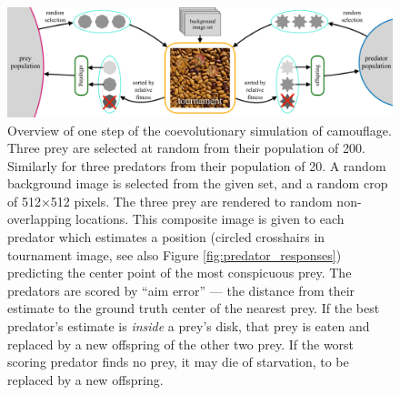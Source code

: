 \documentclass[acmtog]{acmart}
\begin{document}
\begin{figure}
    \includegraphics[width=\textwidth]{images/coc_overview.pdf}
    \caption{Overview of one step of the coevolutionary simulation of camouflage. Three prey are selected at random from their population of 200. Similarly for three predators from their population of 20. A random background image is selected from the given set, and a random crop of 512×512 pixels. The three prey are rendered to random non-overlapping locations. This composite image is given to each predator which estimates a position (circled crosshairs in tournament image, see also Figure \ref{fig:predator_responses}) predicting the center point of the most conspicuous prey. The predators are scored by “aim error” — the distance from their estimate to the ground truth center of the nearest prey. If the best predator's estimate is \textit{inside} a prey's disk, that prey is eaten and replaced by a new offspring of the other two prey. If the worst scoring predator finds no prey, it may die of starvation, to be replaced by a new offspring.}
    \label{fig:simulation_overview}
\end{figure}

\end{document}
